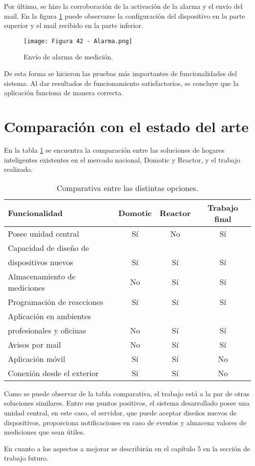 Por último, se hizo la corroboración de la activación de la alarma y el envío del mail. En la figura \ref{fig:42} puede observarse la configuración del dispositivo en la parte superior y el mail recibido en la parte inferior.

\begin{figure}[h]
\centering
\texttt{[image: Figura 42 - Alarma.png]}
\caption[Envío de alarma de medición]{Envío de alarma de medición.}
\label{fig:42}
\end{figure}

De esta forma se hicieron las pruebas más importantes de funcionalidades del sistema. Al dar resultados de funcionamiento satisfactorios, se concluye que la aplicación funciona de manera correcta.

\section{Comparación con el estado del arte}

En la tabla \ref{tab:estadoarte} se encuentra la comparación entre las soluciones de hogares inteligentes existentes en el mercado nacional, Domotic y Reactor, y el trabajo realizado. 

\newpage
\begin{table}[h]
\centering
\caption[Comparativa entre las distintas opciones - Estado del arte]{Comparativa entre las distintas opciones.}
\begin{tabular}{l c c c}
\toprule
\textbf{Funcionalidad} & \textbf{Domotic} & \textbf{Reactor} & \textbf{Trabajo final}\\
\midrule
Posee unidad central			& Sí		& No		& Sí\\
Capacidad de diseño de		&		&		&\\
dispositivos nuevos			& Sí		& Sí		& Sí\\
Almacenamiento de mediciones	& No		& Sí		& Sí\\
Programación de reacciones	& Sí		& Sí		& Sí\\
Aplicación en ambientes		&		&		&\\
profesionales y oficinas		& No		& Sí		& Sí\\
Avisos por mail				& No		& Sí		& Sí\\
Aplicación móvil				& Sí		& Sí		& No\\
Conexión	 desde el exterior	& Sí		& Sí		& No\\
\bottomrule
\hline
\end{tabular}
\label{tab:estadoarte}
\end{table}

Como se puede observar de la tabla comparativa, el trabajo está a la par de otras soluciones similares. Entre sus puntos positivos, el sistema desarrollado posee una unidad central, en este caso, el servidor, que puede aceptar diseños nuevos de dispositivos, proporciona notificaciones en caso de eventos y almacena valores de mediciones que sean útiles.

En cuanto a los aspectos a mejorar se describirán en el capítulo 5 en la sección de trabajo futuro.
